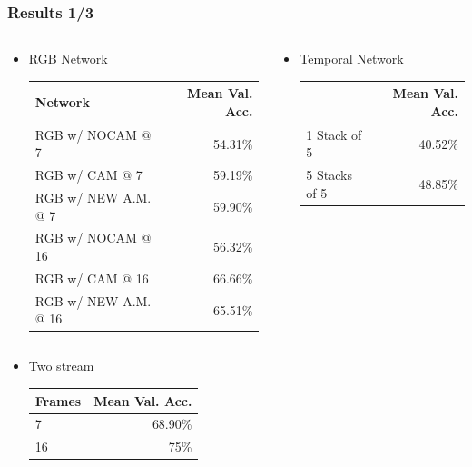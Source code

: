 \documentclass{beamer}
\begin{document}
\begin{frame}
\frametitle{Results 1/3}

	{ \footnotesize 
	\begin{columns}[t]
		\begin{column}{.65\textwidth}
			\begin{itemize}
				\item RGB Network \\
				\vspace*{8pt}
				\begin{tabular}{l|r}
					Network & Mean Val. Acc. \\
					\hline
					RGB w/ NOCAM @ 7 & 54.31\% \\
					RGB w/ CAM @ 7 & 59.19\% \\
					RGB w/ NEW A.M. @ 7 & 59.90\% \\
					\hline
					RGB w/ NOCAM @ 16 & 56.32\% \\
					RGB w/ CAM @ 16 & 66.66\% \\
					RGB w/ NEW A.M. @ 16 & 65.51\% \\
				\end{tabular}
			\end{itemize}
		\end{column}
		\begin{column}{.7\textwidth}
				\begin{itemize}
					\item Temporal Network \\
					\vspace*{8pt}
					\begin{tabular}{l|r}
						& Mean Val. Acc. \\
						\hline
						1 Stack of 5 & 40.52\% \\
						5 Stacks of 5 & 48.85\% \\
					\end{tabular}
				\end{itemize}

			\end{column}
	\end{columns}
	\vspace{12pt}
	\begin{columns}[b]
		\begin{column}{.5\textwidth}
			\begin{itemize}
				\item Two stream \\
				\vspace*{8pt}
				\begin{tabular}{l|r}
					Frames & Mean Val. Acc. \\
					\hline
					7 & 68.90\% \\
					16 & 75\%
				\end{tabular}
			\end{itemize}
		\end{column}
		
	\end{columns}
	}

\end{frame}
\end{document}
